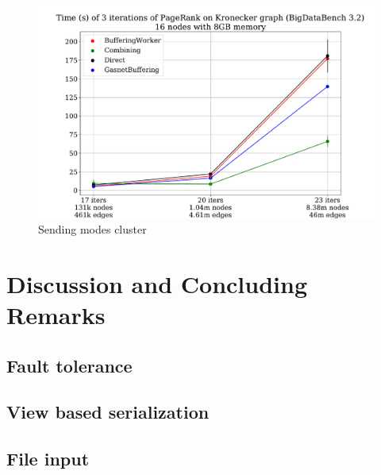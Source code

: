 \documentclass{uit-report}
\begin{document}
\begin{figure}[H]
	\centering
	\includegraphics[width=15cm]{illustrations/sendingmodesabel.pdf}
	\caption{Sending modes cluster}
	\label{fig:sendingmodesabel}
\end{figure}


\newpage
\chapter{Discussion and Concluding Remarks}

\section{Fault tolerance}
\section{View based serialization}
\section{File input}
\end{document}
